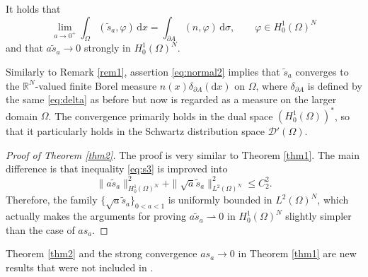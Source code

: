 \documentclass[graybox]{svmult}
\renewcommand{\d}{\mathrm{d}}  %
\newcommand{\R}{\mathbb{R}}  %
\renewcommand{\AA}{A}  %
\begin{document}
\begin{theorem}\label{thm2} It holds that 
\begin{equation}\label{eq:normal2}
	\lim_{a\to0^+} \int_{\Omega}(\tilde{s}_a, \varphi)  \, \d x = \int_{\partial \AA} (n,\varphi) \, \d\sigma, \qquad  \varphi\in H_0^1(\Omega)^N 
	\end{equation}
and that $a \tilde{s}_a \to 0$ strongly in $H_0^1(\Omega)^N$. 
\end{theorem}
\begin{remark} 
Similarly to Remark \ref{rem1}, assertion \eqref{eq:normal2} implies that $\tilde{s}_a$ converges to the $\R^N$-valued finite Borel measure $n(x)\delta_{\partial \AA}(\d x)$ on $\Omega$, where $\delta_{\partial\AA}$ is defined by the same \eqref{eq:delta} as before but now is regarded as a measure on the larger domain $\Omega$. 
The convergence primarily holds in the dual space $(H_0^1(\Omega))^*$, so that it particularly holds in the Schwartz distribution space $\mathcal{D}'(\Omega)$.  \end{remark}
\begin{proof}[Proof of Theorem \ref{thm2}]
The proof is very similar to Theorem \ref{thm1}. The main difference is that inequality \eqref{eq:s3} is improved into 
\begin{equation*} \label{eq:ss3}
 \| a \tilde{s}_a \|_{H_0^1(\Omega)^N}^2 +  \|\sqrt{a} \tilde{s}_a \|_{L^2(\Omega)^N}^2 \le C_2^2. 
\end{equation*}
Therefore, the family $\{\sqrt{a}\tilde{s}_a\}_{0<a<1}$ is uniformly bounded in $L^2(\Omega)^N$, which actually makes the arguments for proving $a\tilde{s}_a \rightharpoonup 0$ in $H_0^1(\Omega)^N$ slightly simpler than the case of $as_a$.  
\end{proof}

\begin{note}
Theorem \ref{thm2} and the strong convergence $as_a \to 0 $ in Theorem \ref{thm1} are new results that were not included in \cite{M1}. 
\end{note}










\end{document}
